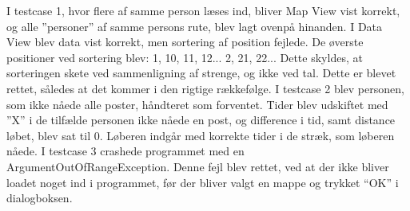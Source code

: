 I testcase 1, hvor flere af samme person læses ind, bliver Map View vist korrekt, og alle ”personer” af samme persons rute, blev lagt ovenpå hinanden. I Data View blev data vist korrekt, men sortering af position fejlede. De øverste positioner ved sortering blev: 1, 10, 11, 12... 2, 21, 22... Dette skyldes, at sorteringen skete ved sammenligning af strenge, og ikke ved tal. Dette er blevet rettet, således at det kommer i den rigtige rækkefølge.\newline
I testcase 2 blev personen, som ikke nåede alle poster, håndteret som forventet. Tider blev udskiftet med ”X” i de tilfælde personen ikke nåede en post, og difference i tid, samt distance løbet, blev sat til 0. Løberen indgår med korrekte tider i de stræk, som løberen nåede.\newline
I testcase 3 crashede programmet med en ArgumentOutOfRangeException. Denne fejl blev rettet, ved at der ikke bliver loadet noget ind i programmet, før der bliver valgt en mappe og trykket “OK” i dialogboksen.




